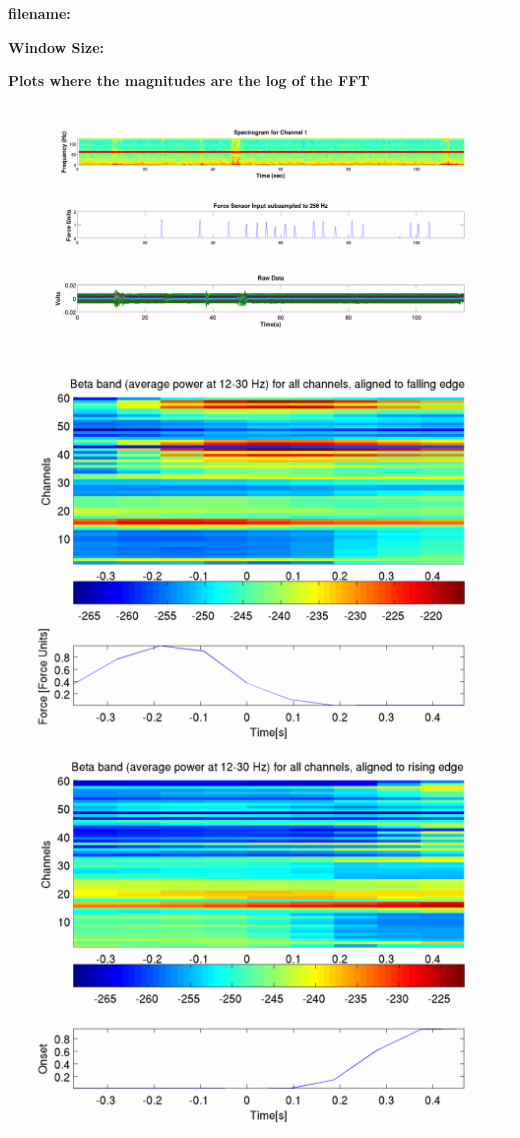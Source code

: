 \documentclass[12pt]{article}
\begin{document}
\begin{center}
\textbf{filename: \expandafter\detokenize\expandafter{\myvar}}

\textbf{Window Size: \expandafter\detokenize\expandafter{\window}}

\textbf{Plots where the magnitudes are the log of the FFT }
\end{center}

\includegraphics[scale=0.14]{raw_data_spectrogram.png}

\includegraphics[scale=0.2]{beta_falling_log.png}
\includegraphics[scale=0.2]{beta_rising_log.png}
\end{document}
